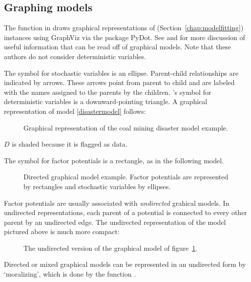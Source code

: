 \documentclass[]{jss}
\begin{document}
\subsection{Graphing models} \label{graphical}


The function  in  draws graphical representations of  (Section~\ref{chap:modelfitting}) instances using GraphViz via the  package PyDot. See \citet{dawidmarkov} and \citet{Jordan:2004p5439} for more discussion of useful information that can be read off of graphical models. Note that these authors do not consider deterministic variables.

The symbol for stochastic variables is an ellipse. Parent-child relationships are indicated by arrows. These arrows point from parent to child and are labeled with the names assigned to the parents by the children. 's symbol for deterministic variables is a downward-pointing triangle. A graphical representation of model \ref{disastermodel} follows:
\begin{figure}[h!]
\begin{center}
    \caption{Graphical representation of the coal mining disaster model example.}
\end{center}
\end{figure}
$D$ is shaded because it is flagged as data.


The symbol for factor potentials is a rectangle, as in the following model.
\begin{figure}[h!]
\begin{center}
    \caption{Directed graphical model example. Factor potentials are represented by rectangles and stochastic variables by ellipses.}
    \label{fig:dgm}
\end{center}
\end{figure}
Factor potentials are usually associated with \emph{undirected} grahical models. In undirected representations, each parent of a potential is connected to every other parent by an undirected edge. The undirected representation of the model pictured above is much more compact:
\begin{figure}[h!]
\begin{center}
    \caption{The undirected version of the graphical model of figure~\ref{fig:dgm}.}
\end{center}
\end{figure}
Directed or mixed graphical models can be represented in an undirected form by `moralizing', which is done by the function .
\end{document}
